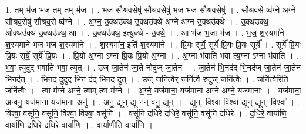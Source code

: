 \documentclass[17pt]{extarticle}
\begin{document}
1. तम् भ॑ज भज॒ तम् तम् भ॑ज । . भ॒ज॒ सौ॒श्र॒व॒सेषु॑ सौश्रव॒सेषु॑ भज भज सौश्रव॒सेषु॑ । . सौ॒श्र॒व॒से ष्व॑ग्ने अग्ने सौश्रव॒सेषु॑ सौश्रव॒से ष्व॑ग्ने । . अ॒ग्न॒ उ॒क्थ‍उ॑क्थ उ॒क्थ‍उ॑क्थे अग्ने अग्न उ॒क्थ‍उ॑क्थे । . उ॒क्थ‍उ॑क्थ॒ ओक्थ‍उ॑क्थ उ॒क्थ‍उ॑क्थ॒ आ । . उ॒क्थ‍उ॑क्थ॒ इत्यु॒क्थे - उ॒क्थे॒ । . आ भ॑ज भ॒जा भ॑ज । . भ॒ज॒ श॒स्यमा॑ने श॒स्यमा॑ने भज भज श॒स्यमा॑ने । . श॒स्यमा॑न॒ इति॑ श॒स्यमा॑ने । . प्रि॒यः सूर्ये॒ सूर्ये᳚ प्रि॒यः प्रि॒यः सूर्ये᳚ । . सूर्ये᳚ प्रि॒यः प्रि॒यः सूर्ये॒ सूर्ये᳚ प्रि॒यः । . प्रि॒यो अ॒ग्ना ऽग्ना प्रि॒यः प्रि॒यो अ॒ग्ना । . अ॒ग्ना भ॑वाति भवा त्य॒ग्ना ऽग्ना भ॑वाति । . भ॒वा॒ त्युदुद् भ॑वाति भवा॒ त्युत् । . उज् जा॒तेन॑ जा॒ते नोदुज् जा॒तेन॑ । . जा॒तेन॑ भि॒नद॑द् भि॒नद॑ज् जा॒तेन॑ जा॒तेन॑ भि॒नद॑त् । . भि॒नद॒ दुदुद् भि॒न द॑द् भि॒नद॒ दुत् । . उज् जनि॑त्वै॒र् जनि॑त्वै॒ रुदुज् जनि॑त्वैः । . जनि॑त्वै॒रिति॒ जनि॑त्वैः । . त्वा म॑ग्ने अग्ने॒ त्वाम् त्वा म॑ग्ने । . अ॒ग्ने॒ यज॑माना॒ यज॑माना अग्ने अग्ने॒ यज॑मानाः । . यज॑माना॒ अन्वनु॒ यज॑माना॒ यज॑माना॒ अनु॑ । . अनु॒ द्यून् द्यू नन् वनु॒ द्यून् । . द्यून्. विश्वा॒ विश्वा॒ द्यून् द्यून्. विश्वा᳚ । . विश्वा॒ वसू॑नि॒ वसू॑नि॒ विश्वा॒ विश्वा॒ वसू॑नि । . वसू॑नि दधिरे दधिरे॒ वसू॑नि॒ वसू॑नि दधिरे । . द॒धि॒रे॒ वार्या॑णि॒ वार्या॑णि दधिरे दधिरे॒ वार्या॑णि । . वार्या॒णीति॒ वार्या॑णि । \newline
\end{document}
